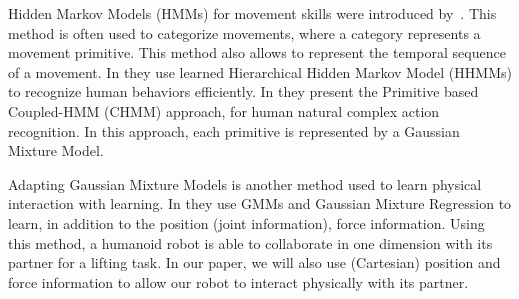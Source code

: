 \documentclass[utf8]{frontiersSCNS} %
\newcommand{\todo}[1]{\textcolor{red}{\textbf{/*#1*/}}}
\begin{document}
%

Hidden Markov Models (HMMs) for  movement skills were introduced by~\cite{fine1998hierarchical}.
This method is often used to categorize movements, where a category represents a movement primitive. This method also allows to represent the temporal sequence of a movement. 
In \cite{nguyen2005learning} they use learned Hierarchical Hidden Markov Model (HHMMs) to recognize human behaviors efficiently. 
In \cite{ren2002human} they present the Primitive based Coupled-HMM (CHMM) approach, for human natural complex action recognition. In this approach, each primitive is represented by a Gaussian Mixture Model.


Adapting Gaussian Mixture Models is another method used to learn physical interaction with %
learning. In \cite{evrard2009teaching} they use GMMs and Gaussian Mixture Regression to learn, in addition to the position (joint information), force information. Using this method, a humanoid robot is able to collaborate in one dimension with its partner for a lifting task. In our paper, we will also use (Cartesian) position and force information to allow our robot to interact physically with its partner.

\end{document}
